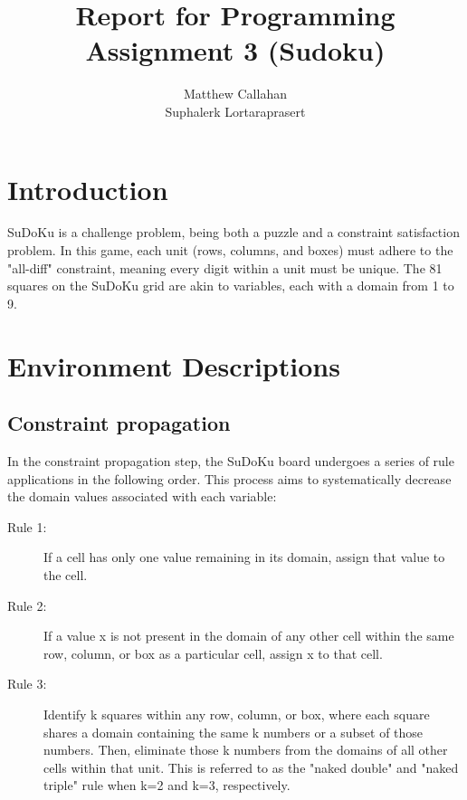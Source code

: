 \documentclass{article}
\title{Report for Programming Assignment 3 (Sudoku)}
\author{%
  Matthew Callahan\\
  \And
  Suphalerk Lortaraprasert
}
\begin{document}
\maketitle


\begin{abstract}
  
 \end{abstract}

\section{Introduction}
SuDoKu is a challenge problem, being both a puzzle and a constraint satisfaction problem. In this game, each unit (rows, columns, and boxes) must adhere to the "all-diff" constraint, meaning every digit within a unit must be unique. The 81 squares on the SuDoKu grid are akin to variables, each with a domain from 1 to 9.

  
\section{Environment Descriptions}

\subsection{Constraint propagation}
In the constraint propagation step, the SuDoKu board undergoes a series of rule applications in the following order. This process aims to systematically decrease the domain values associated with each variable:
\begin{description}
  \item[Rule 1:] If a cell has only one value remaining in its domain, assign that value to the cell.
  \item[Rule 2:] If a value x is not present in the domain of any other cell within the same row, column, or box as a particular cell, assign x to that cell.
  \item[Rule 3:] Identify k squares within any row, column, or box, where each square shares a domain containing the same k numbers or a subset of those numbers. Then, eliminate those k numbers from the domains of all other cells within that unit. This is referred to as the "naked double" and "naked triple" rule when k=2 and k=3, respectively.
\end{description}


\label{alg:Constraint Propagation}
 
 
 
\end{document}
